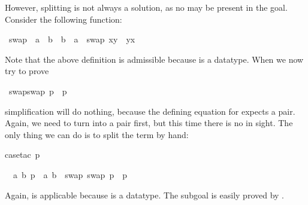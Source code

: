 \begin{isabellebody}
\begin{isamarkuptxt}
However, splitting  is not always a solution, as no 
may be present in the goal. Consider the following function:%
\end{isamarkuptxt}%
\isamarkuptrue%
%
\endisatagproof
{\isafoldproof}%
%
\isadelimproof
%
\endisadelimproof
{}\isamarkupfalse%
\ swap\ {}{}\ {}{}a\ {}\ {}b\ {}\ {}b\ {}\ {}a{}\ \ {}swap\ {}x{}y{}\ {}\ {}y{}x{}{}%
\begin{isamarkuptext}%
\noindent
Note that the above  definition is admissible
because  is a datatype. When we now try to prove%
\end{isamarkuptext}%
\isamarkuptrue%
\isamarkupfalse%
\ {}swap{}swap\ p{}\ {}\ p{}%
\isadelimproof
%
\endisadelimproof
%
\isatagproof
%
\begin{isamarkuptxt}%
\noindent
simplification will do nothing, because the defining equation for
 expects a pair. Again, we need to turn 
into a pair first, but this time there is no  in sight.
The only thing we can do is to split the term by hand:%
\end{isamarkuptxt}%
\isamarkuptrue%
\isamarkupfalse%
{}case{}tac\ p{}%
\begin{isamarkuptxt}%
\noindent
\begin{isabelle}%
\ {}{}\ {}a\ b{}\ p\ {}\ {}a{}\ b{}\ {}\ swap\ {}swap\ p{}\ {}\ p%
\end{isabelle}
Again,  is applicable because  is a datatype.
The subgoal is easily proved by .


\end{isamarkuptxt}
\end{isabellebody}

